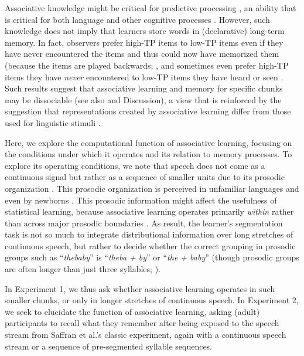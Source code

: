 \documentclass[]{article}
\begin{document}
Associative knowledge might be critical for predictive processing \citep{Sherman2020, Turk-Browne2010}, an ability that is critical for both language \citep{Levy2008, Trueswell1999} and other cognitive processes \citep{Clark2013, Friston2010, Keller2018}. However, such knowledge does not imply that learners store words in (declarative) long-term memory. In fact, observers prefer high-TP items to low-TP items even if they have never encountered the items and thus could now have memorized them (because the items are played backwards; \citealp{Turk-Browne-reversal,Jones2007}, and sometimes even prefer high-TP items they have \emph{never} encountered to low-TP items they have heard or seen \citep{Endress-Phantoms-Vision}. Such results suggest that associative learning and memory for specific chunks may be dissociable (see also \citealp{Knowlton1996a, Poldrack2001, Squire1992} and Discussion), a view that is reinforced by the suggestion that representations created by associative learning differ from those used for linguistic stimuli \citep{Endress-Phantoms-Vision, Fischer-Baum2011}. 

Here, we explore the computational function of associative learning, focusing on the conditions under which it operates and its relation to memory processes. To explore its operating conditions, we note that speech does not come as a continuous signal but rather as a sequence of smaller units due to its prosodic organization \citep{Cutler1997, Nespor1986, Shattuck-Hufnagel1996}. This prosodic organization is perceived in unfamiliar languages \citep{Brentari2011, Endress-cross-seg, Fenlon2008, Pilon1981} and even by newborns \citep{Christophe2001}. This prosodic information might affect the usefulness of statistical learning, because associative learning operates primarily \emph{within} rather than across major prosodic boundaries \citep{Shukla2007}. As result, the learner's segmentation task is not so much to integrate distributional information over long stretches of continuous speech, but rather to decide whether the correct grouping in prosodic groups such as ``\emph{thebaby}'' is ``\emph{theba + by}'' or ``\emph{the + baby}'' (though prosodic groups are often longer than just three syllables; \citealt{Nespor1986}).

In Experiment 1, we thus ask whether associative learning operates in such smaller chunks, or only in longer stretches of continuous speech. In Experiment 2, we seek to elucidate the function of associative learning, asking (adult) participants to recall what they remember after being exposed to the speech stream from Saffran et al.'s \citep{Saffran-Science} classic experiment, again with a continuous speech stream or a sequence of pre-segmented syllable sequences.
\end{document}
